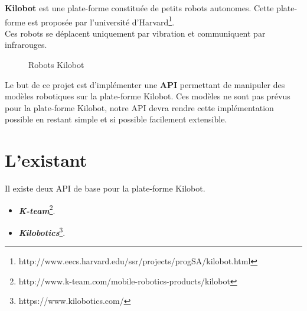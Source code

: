 \documentclass[a4paper,8pt]{report}
\begin{document}
\textbf{Kilobot} est une plate-forme constitu\'ee de petits robots autonomes. Cette plate-forme est propos\'ee par l'universit\'e d'Harvard\footnote{http://www.eecs.harvard.edu/ssr/projects/progSA/kilobot.html}. \\
Ces robots se d\'eplacent uniquement par vibration et communiquent par infrarouges.\\

\begin{figure}[!h]
    \centering
    \caption{Robots Kilobot}
    \label{pandas}
\end{figure}

\smallskip
Le but de ce projet est d'impl\'ementer une \textbf{API} permettant de manipuler des mod\`eles robotiques sur la plate-forme Kilobot. Ces mod\`eles ne sont pas pr\'evus pour la plate-forme Kilobot, notre API devra rendre cette impl\'ementation possible en restant simple et si possible facilement extensible.\\

\bigskip

\section*{L'existant}\label{sec:name}

Il existe deux API de base pour la plate-forme Kilobot.\\

\begin{itemize}
\item \textit{\textbf{K-team}}\footnote{http://www.k-team.com/mobile-robotics-products/kilobot}.
\item \textit{\textbf{Kilobotics}}\footnote{https://www.kilobotics.com/}.
\end{itemize}
\end{document}
